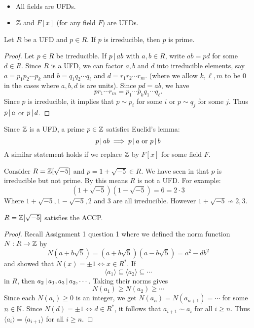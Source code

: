 \documentclass[11pt]{article}
\begin{document}
\begin{example}\,
    \begin{itemize}
        \item All fields are UFDs.
        \item $\mathbb{Z}$ and $F[x]$ (for any field $F$) are UFDs.
    \end{itemize}
\end{example}

\begin{proposition}
    Let $R$ be a UFD and $p\in R$. If $p$ is irreducible, then $p$ is prime.
\end{proposition}

\begin{proof}
    Let $p\in R$ be irreducible. If $p\,|\, ab$ with $a,b\in R$, write $ab=pd$ for some $d\in R$. Since $R$ is a UFD, we can factor $a,b$ and $d$ into irreducible elements, say $a=p_1p_2\cdots p_k$ and $b=q_1q_2\cdots q_\ell$ and $d=r_1r_2\cdots r_m$. (where we allow $k,\ell,m$ to be 0 in the cases where $a,b,d$ is are units). Since $pd=ab$, we have
    \[pr_1\cdots r_m=p_1\cdots p_kq_1\cdots q_\ell.\]
    Since $p$ is irreducible, it implies that $p\sim p_i$ for some $i$ or $p\sim q_j$ for some $j$. Thus $p\,|\, a$ or $p\,|\, d$.
\end{proof}

\begin{example}
    Since $\mathbb{Z}$ is a UFD, a prime $p\in\mathbb{Z}$ satisfies Euclid's lemma:
    \[p\,|\, ab\implies p\,|\, a\text{ or }p\,|\, b\]
    A similar statement holds if we replace $\mathbb{Z}$ by $F[x]$ for some field $F$.
\end{example}

\begin{example}
    Consider $R=\mathbb{Z}[\sqrt{-5}]$ and $p=1+\sqrt{-5}\in R$. We have seen in  that $p$ is irreducible but not prime. By  this means $R$ is not a UFD. For example:
    \[(1+\sqrt{-5})(1-\sqrt{-5})=6=2\cdot 3\]
    Where $1+\sqrt{-5},1-\sqrt{-5},2$ and $3$ are all irreducible. However $1+\sqrt{-5}\not\sim 2,3$.
\end{example}

\begin{example}
    $R=\mathbb{Z}[\sqrt{-5}]$ satisfies the ACCP.
\end{example}

\begin{proof}
    Recall Assignment 1 question 1 where we defined the norm function $N:R\to\mathbb{Z}$ by
    \[N(a+b\sqrt{5})=(a+b\sqrt{5})(a-b\sqrt{5})=a^2-db^2\]
    and showed that $N(x)=\pm1\iff x\in R^*$. If
    \[\langle a_1\rangle\subseteq\langle a_2\rangle\subseteq\cdots\]
    in $R$, then $a_2\,|\, a_1,a_3\,|\, a_2,\cdots$. 
    Taking their norms gives
    \[N(a_1)\geq N(a_2)\geq\cdots\]
    Since each $N(a_i)\geq0$ is an integer, we get $N(a_n)=N(a_{n+1})=\cdots$ for some $n\in\mathbb{N}$. Since $N(d)=\pm1\iff d\in R^*$, it follows that $a_{i+1}\sim a_i$ for all $i\geq n$. Thus $\langle a_i\rangle=\langle a_{i+1}\rangle$ for all $i\geq n$.
    
\end{proof}
\end{document}
